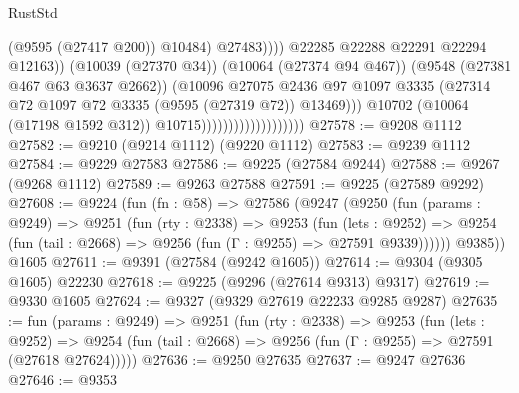 \begin{lexlean}{RustStd}
\begin{coremodule}
                                                          (@9595 (@27417 @200))
                                                          @10484)
                                                        @27483))))
                                                @22285
                                                @22288
                                                @22291
                                                @22294
                                                @12163))
                                            (@10039 (@27370 @34))
                                            (@10064 (@27374 @94 @467))
                                            (@9548 (@27381 @467 @63 @3637 @2662))
                                            (@10096
                                              @27075
                                              @2436
                                              @97
                                              @1097
                                              @3335
                                              (@27314
                                                @72
                                                @1097
                                                @72
                                                @3335
                                                (@9595 (@27319 @72))
                                                @13469)))
                                          @10702
                                          (@10064 (@17198 @1592 @312))
                                          @10715)))))))))))))))))))
@27578 := @9208 @1112
@27582 := @9210 (@9214 @1112) (@9220 @1112)
@27583 := @9239 @1112
@27584 := @9229 @27583
@27586 := @9225 (@27584 @9244)
@27588 := @9267 (@9268 @1112)
@27589 := @9263 @27588
@27591 := @9225 (@27589 @9292)
@27608 := @9224
    (fun (fn : @58) =>
    @27586
      (@9247
        (@9250
          (fun (params : @9249) =>
          @9251
            (fun (rty : @2338) =>
            @9253
              (fun (lets : @9252) =>
              @9254 (fun (tail : @2668) => @9256 (fun (Γ : @9255) => @27591 @9339))))))
        @9385))
    @1605
@27611 := @9391 (@27584 (@9242 @1605))
@27614 := @9304 (@9305 @1605) @22230
@27618 := @9225 (@9296 (@27614 @9313) @9317)
@27619 := @9330 @1605
@27624 := @9327 (@9329 @27619 @22233 @9285 @9287)
@27635 := fun (params : @9249) =>
  @9251
    (fun (rty : @2338) =>
    @9253
      (fun (lets : @9252) =>
      @9254 (fun (tail : @2668) => @9256 (fun (Γ : @9255) => @27591 (@27618 @27624)))))
@27636 := @9250 @27635
@27637 := @9247 @27636
@27646 := @9353

\end{coremodule}
\end{lexlean}
